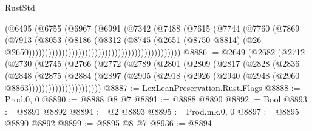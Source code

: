 \begin{lexlean}{RustStd}
\begin{coremodule}
                                                              (@6495
                                                                (@6755
                                                                  (@6967
                                                                    (@6991
                                                                      (@7342
                                                                        (@7488
                                                                          (@7615
                                                                            (@7744
                                                                              (@7760
                                                                                (@7869
                                                                                  (@7913
                                                                                    (@8053
                                                                                      (@8186
                                                                                        (@8312
                                                                                          (@8745
                                                                                            (@2651
                                                                                              (@8750
                                                                                                @8814)
                                                                                              (@26
                                                                                                @2650))))))))))))))))))))))))))))))))))))))))))))))
@8886 := @2649
    (@2682
      (@2712
        (@2730
          (@2745
            (@2766
              (@2772
                (@2789
                  (@2801
                    (@2809
                      (@2817
                        (@2828
                          (@2836
                            (@2848
                              (@2875
                                (@2884
                                  (@2897
                                    (@2905
                                      (@2918 (@2926 (@2940 (@2948 (@2960 @8863))))))))))))))))))))))
@8887 := LexLeanPreservation.Rust.Flags
@8888 := Prod.{0, 0}
@8890 := @8888 @8 @7
@8891 := @8888 @8890
@8892 := Bool
@8893 := @8891 @8892
@8894 := @2 @8893
@8895 := Prod.mk.{0, 0}
@8897 := @8895 @8890 @8892
@8899 := @8895 @8 @7
@8936 := @8894

\end{coremodule}
\end{lexlean}
